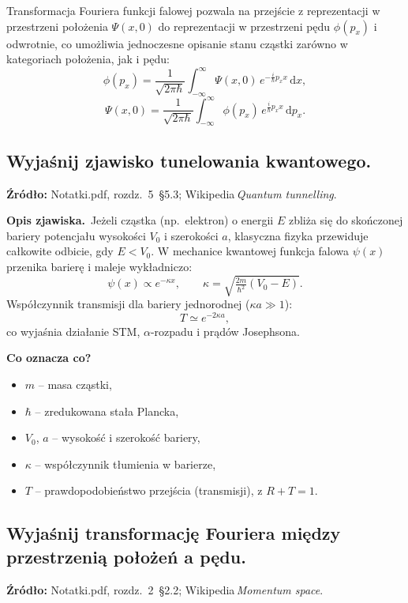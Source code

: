 Transformacja Fouriera funkcji falowej pozwala na przejście z reprezentacji w przestrzeni położenia \(\Psi(x,0)\) do reprezentacji w przestrzeni pędu \(\phi(p_x)\) i odwrotnie, co umożliwia jednoczesne opisanie stanu cząstki zarówno w kategoriach położenia, jak i pędu:
\[
\phi(p_x)
=\frac{1}{\sqrt{2\pi\hbar}}
\int_{-\infty}^{\infty}
\Psi(x,0)\,e^{-\frac{i}{\hbar}p_x x}\,\mathrm{d}x,
\]
\[
\Psi(x,0)
=\frac{1}{\sqrt{2\pi\hbar}}
\int_{-\infty}^{\infty}
\phi(p_x)\,e^{\frac{i}{\hbar}p_x x}\,\mathrm{d}p_x.
\]

\subsection{Wyjaśnij zjawisko tunelowania kwantowego.}

\textbf{Źródło:} Notatki.pdf, rozdz.~5~\S5.3; Wikipedia\,\emph{Quantum tunnelling}.
		
		\vspace{4pt}
		\textbf{Opis zjawiska.}\  
		Jeżeli cząstka (np.~elektron) o energii $E$ zbliża się do skończonej bariery
		potencjału wysokości $V_0$ i szerokości $a$, klasyczna fizyka
		przewiduje całkowite odbicie, gdy $E<V_0$.
		W mechanice kwantowej funkcja falowa $\psi(x)$ przenika barierę i maleje
		wykładniczo:
		\[
		\psi(x)\propto e^{-\kappa x},\qquad \kappa=\sqrt{\tfrac{2m}{\hbar^{2}}(V_0-E)}.
		\]
		Współczynnik transmisji dla bariery jednorodnej ($\kappa a\gg1$):
		\[
		T\simeq e^{-2\kappa a},
		\]
		co wyjaśnia działanie STM, $\alpha$-rozpadu i prądów Josephsona.
		
		\vspace{4pt}
		\textbf{Co oznacza co?}
		\begin{itemize}
			\item $m$ – masa cząstki,
			\item $\hbar$ – zredukowana stała Plancka,
			\item $V_0$, $a$ – wysokość i szerokość bariery,
			\item $\kappa$ – współczynnik tłumienia w barierze,
			\item $T$ – prawdopodobieństwo przejścia (transmisji), z $R+T=1$.
		\end{itemize}

\subsection{Wyjaśnij transformację Fouriera między przestrzenią położeń a pędu.}

\textbf{Źródło:} Notatki.pdf, rozdz.~2~\S2.2; Wikipedia\,\emph{Momentum space}.
		
